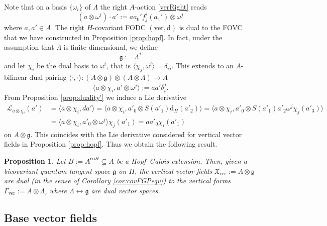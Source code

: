 \documentclass{article}
\newtheorem{proposition}[thm]{Proposition}
\theoremstyle{definition}
\newcommand{\de}{{\delta}}
\newcommand{\fg}{{\mathfrak{g}}}
\begin{document}
Note that on a basis $\{\omega_i\}$ of $\Lambda$ the right $A$-action \eqref{verRight} reads
$$
(a \otimes \omega^i)\cdot a':=aa_0' f_j^i(a_1')\otimes \omega^j
$$
where $a,a'\in A$. The right $H$-covariant FODC $(\mathrm{ver},\mathrm{d})$ is dual to the FOVC that we have constructed in Proposition \ref{prop:hopf}.
In fact, under the assumption that $\Lambda$ is finite-dimensional, we define
$$
\fg:=\Lambda^*
$$
and let $\chi_i$ be the dual basis to $\omega^i$, that is $\langle \chi_j, \omega^i\rangle=\de_{ij}$. This extends to an $A$-bilinear dual pairing $\langle\cdot,\cdot\rangle\colon (A\otimes\mathfrak{g})\otimes(A\otimes\Lambda)\to A$
\begin{equation}
	\langle a\otimes\chi_i,a'\otimes\omega^j\rangle
	:=aa'\delta_i^j.
\end{equation}
From Proposition \ref{prop:duality'} we induce a Lie derivative 
\begin{align*}
	\mathscr{L}_{a\otimes\chi_i}(a')
	&=\langle a\otimes\chi_i, da'\rangle
	=\langle a\otimes\chi_i, a'_0\otimes S(a'_1)\mathrm{d}_H(a'_2)\rangle
	=\langle a\otimes\chi_i, a'_0\otimes S(a'_1)a'_2\omega^j\chi_j(a'_3)\rangle\\
	&=\langle a\otimes\chi_i, a'_0\otimes\omega^j\rangle\chi_j(a'_1)
	=aa'_0\chi_i(a'_1)
\end{align*}
on $A\otimes\mathfrak{g}$. This coincides with the Lie derivative considered for vertical vector fields in Proposition \ref{prop:hopf}. Thus we obtain the following result.
\begin{proposition}
	Let $B:=A^{\mathrm{co}H}\subseteq A$ be a Hopf--Galois extension. Then, given a bicovariant quantum tangent space $\mathfrak{g}$ on $H$, the vertical vector fields $\mathfrak{X}_\mathrm{ver}:=A\otimes\mathfrak{g}$ are dual (in the sense of Corollary \ref{cor:covFGPequ}) to the vertical forms $\Gamma_\mathrm{ver}:=A\otimes\Lambda$,  where $\Lambda\leftrightarrow\mathfrak{g}$ are dual vector spaces.
\end{proposition}



\subsection{Base vector fields}\label{base-vf-sec}
\end{document}

